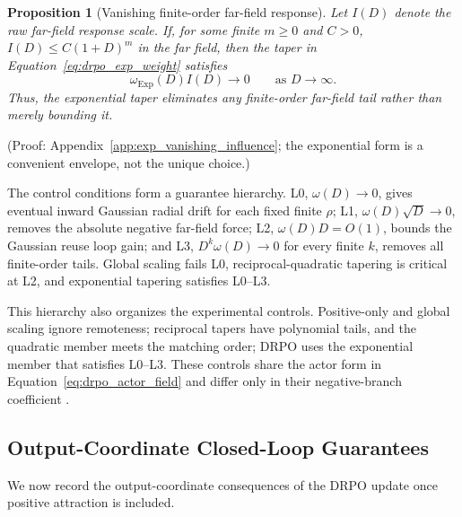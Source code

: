 \documentclass{article}
\theoremstyle{plain}
\newtheorem{proposition}[theorem]{Proposition}
\theoremstyle{definition}
\theoremstyle{remark}
\begin{document}
\begin{proposition}[Vanishing finite-order far-field response]
\label{prop:exp_vanishing_influence}
Let \(I(D)\) denote the raw far-field response scale. If, for some
finite \(m\geq0\) and \(C>0\),
\(I(D)\leq C(1+D)^m\) in the far field, then the taper in
Equation~\eqref{eq:drpo_exp_weight} satisfies
\[
    \omega_{\mathrm{Exp}}(D) I(D)
    \longrightarrow 0
    \qquad
    \text{as }D\to\infty .
\]
Thus, the exponential taper eliminates any finite-order far-field tail
rather than merely bounding it.
\end{proposition}

(Proof: Appendix~\ref{app:exp_vanishing_influence}; the exponential form is
a convenient envelope, not the unique choice.)

The control conditions form a guarantee hierarchy. L0,
\(\omega(D)\to0\), gives eventual inward Gaussian radial drift for each
fixed finite \(\rho\); L1, \(\omega(D)\sqrt D\to0\), removes the
absolute negative far-field force; L2, \(\omega(D)D=O(1)\), bounds the
Gaussian reuse loop gain; and L3,
\(D^k\omega(D)\to0\) for every finite \(k\), removes all finite-order
tails. Global scaling fails L0, reciprocal-quadratic tapering is critical at
L2, and exponential tapering satisfies L0--L3. 

This hierarchy also organizes the experimental controls. Positive-only and
global scaling ignore remoteness; reciprocal tapers have polynomial tails, and the quadratic member meets the matching
order; DRPO uses the exponential member that satisfies
L0--L3. These controls share the actor form in
Equation~\eqref{eq:drpo_actor_field} and differ only in their negative-branch
coefficient \citep{peng2019advantage,nair2020awac,kostrikov2021offline,
grigsby2021closer,arnal2025asymmetric,leroux2025tapered}.

\subsection{Output-Coordinate Closed-Loop Guarantees}

We now record the output-coordinate consequences of the DRPO update once
positive attraction is included.
\end{document}
